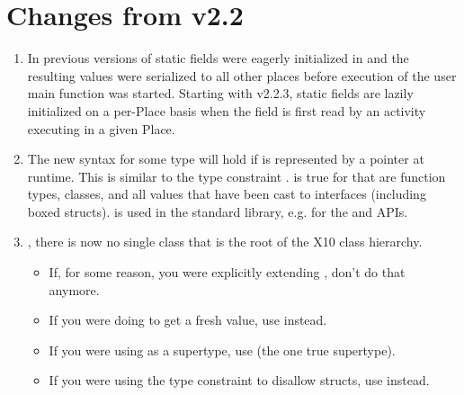 \section{Changes from \Xten{} v2.2}

\begin{enumerate}

\item In previous versions of \Xten{} static fields were
  eagerly initialized in  and the resulting values were
  serialized to all other places before execution of the user main
  function was started. Starting with \Xten{} v2.2.3, static fields are
  lazily initialized on a per-Place basis when the field is first read
  by an activity executing in a given Place.

\item The new syntax  for some type  will hold if
   is represented by a pointer at runtime.  This is similar to
  the type constraint .   is true for
   that are function types, classes, and all values that have
  been cast to interfaces (including boxed structs).   is used
  in the standard library, e.g. for the  and
   APIs.

\item {}, there is now no single class that
  is the root of the X10 class hierarchy.
\begin{itemize}
  \item If, for some reason, you were explicitly extending , don't do
    that anymore.
  \item If you were doing  to get a fresh value, use
     instead.
  \item If you were using  as a supertype, use 
    (the one true supertype).  
  \item If you were using the type constraint  to
    disallow structs, use  instead.
\end{itemize}


\end{enumerate}
